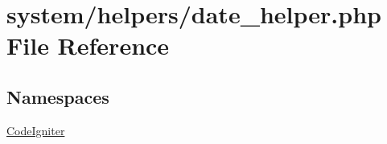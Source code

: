 \hypertarget{date__helper_8php}{}\section{system/helpers/date\+\_\+helper.php File Reference}
\label{date__helper_8php}
\subsection*{Namespaces}
\begin{DoxyCompactItemize}
\item 
 \mbox{\hyperlink{namespace_code_igniter}{Code\+Igniter}}
\end{DoxyCompactItemize}
